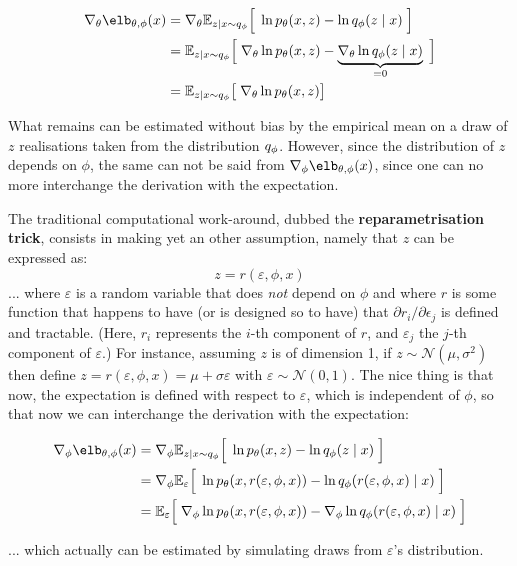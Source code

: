 \documentclass{article}
\begin{document}
\begin{appendix}
\begin{multicols}{2}
\begin{align*}
\nabla_\theta\elb_{\theta,\phi}(x) & = \nabla_\theta \esp_{z|x \sim q_\phi} \Big[ \; \ln  \pt(x, z) -\ln \qp(z \mid x)  \; \Big] \\
& = \esp_{z|x \sim q_\phi} \Big[ \; \nabla_\theta \ln \pt(x, z) - \underbrace{ \nabla_\theta \ln \qp(z \mid x) }_{= 0} \; \Big] \\
& = \esp_{z|x \sim q_\phi} \big[ \; \nabla_\theta \ln \pt(x, z)\big] \\
\end{align*}

What remains can be estimated without bias by the empirical mean on a draw of $z$ realisations taken from the distribution $q_\phi$.
However, since the distribution of $z$ depends on $\phi$, the same can not be said from $\nabla_\phi\elb_{\theta,\phi}(x)$, since one can no more interchange the derivation with the expectation.

The traditional computational work-around, dubbed the \textbf{reparametrisation trick}, consists in making yet an other assumption, namely that $z$ can be expressed as:
$$z=r(\varepsilon, \phi, x)$$
... where $\varepsilon$ is a random variable that does \textit{not} depend on $\phi$ and where $r$ is some function that happens to have (or is designed so to have) that $\partial r_i / \partial \epsilon_j$ is defined and tractable. (Here, $r_i$ represents the $i$-th component of $r$, and $\varepsilon_j$ the $j$-th component of $\varepsilon$.) For instance, assuming $z$ is of dimension 1, if $z\sim \mathcal{N}(\mu,\sigma^2)$ then define $z=r(\varepsilon, \phi, x)=\mu+\sigma \varepsilon$ with $\varepsilon\sim\mathcal{N}(0,1)$. The nice thing is that now, the expectation is defined with respect to $\varepsilon$, which is independent of $\phi$, so that now we can interchange the derivation with the expectation:

\begin{align*}
\nabla_\phi\elb_{\theta,\phi}(x) & = \nabla_\phi \esp_{z|x \sim q_\phi} \Big[ \; \ln  \pt(x, z) -\ln \qp(z \mid x)  \; \Big] \\
& = \nabla_\phi \esp_{\varepsilon} \Big[ \; \ln  \pt(x, r(\varepsilon,\phi,x)) -\ln \qp(r(\varepsilon,\phi,x) \mid x)  \; \Big] \\
& = \esp_{\varepsilon} \Big[ \; \nabla_\phi \ln  \pt(x, r(\varepsilon,\phi,x)) - \nabla_\phi \ln \qp(r(\varepsilon,\phi,x) \mid x)  \; \Big]
\end{align*}

... which actually can be estimated by simulating draws from $\varepsilon$'s distribution.


\end{multicols}
\end{appendix}
\end{document}
